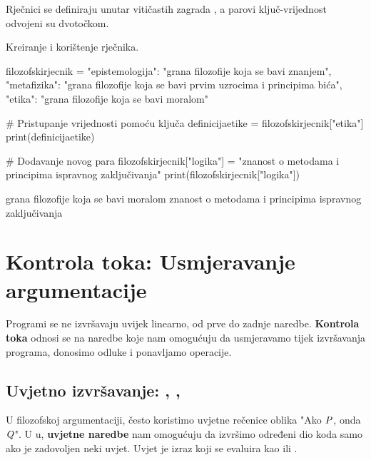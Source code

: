 Rječnici se definiraju unutar vitičastih zagrada \pyinline{{}}, a parovi ključ-vrijednost odvojeni su dvotočkom.

\begin{primjerokvir}
    Kreiranje i korištenje rječnika.
    \begin{pythoncode}
filozofskirjecnik = {
    "epistemologija": "grana filozofije koja se bavi znanjem",
    "metafizika": "grana filozofije koja se bavi prvim uzrocima i principima bića",
    "etika": "grana filozofije koja se bavi moralom"
}

# Pristupanje vrijednosti pomoću ključa
definicijaetike = filozofskirjecnik["etika"]
print(definicijaetike)

# Dodavanje novog para
filozofskirjecnik["logika"] = "znanost o metodama i principima ispravnog zaključivanja"
print(filozofskirjecnik["logika"])
    \end{pythoncode}
    \begin{codeoutput}
grana filozofije koja se bavi moralom
znanost o metodama i principima ispravnog zaključivanja
    \end{codeoutput}
\end{primjerokvir}

\section{Kontrola toka: Usmjeravanje argumentacije}
\label{sec:kontrolatoka}

Programi se ne izvršavaju uvijek linearno, od prve do zadnje naredbe. \textbf{Kontrola toka} odnosi se na naredbe koje nam omogućuju da usmjeravamo tijek izvršavanja programa, donosimo odluke i ponavljamo operacije.

\subsection{Uvjetno izvršavanje: , , }

U filozofskoj argumentaciji, često koristimo uvjetne rečenice oblika "Ako $\mathit{P}$, onda $\mathit{Q}$". U u, \textbf{uvjetne naredbe} nam omogućuju da izvršimo određeni dio koda samo ako je zadovoljen neki uvjet. Uvjet je izraz koji se evaluira kao  ili .

